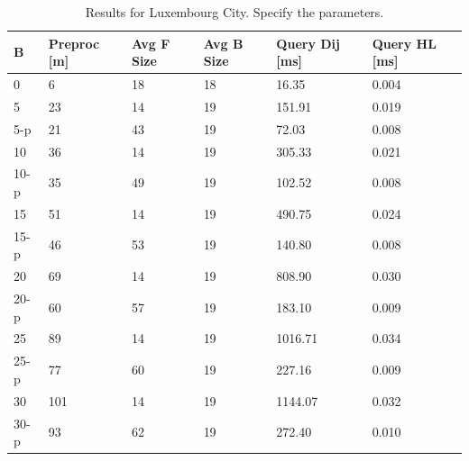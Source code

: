 \begin{table}
\begin{center}
\begin{tabular}{ | l | p{1cm} | p{1cm} | p{1cm} | p{1.2cm} | p{1.2cm} |}
\hline
	B & Preproc  [m] & Avg F Size & Avg B Size & Query Dij [ms] & Query HL [ms] \\ \hline \hline
	0 & 6 & 18 & 18 & 16.35 & 0.004 \\ \hline
	5 & 23 & 14& 19 & 151.91 & 0.019 \\ 
	5-p & 21 & 43 &19 & 72.03 & 0.008 \\ \hline
	10 & 36 & 14 & 19 & 305.33 & 0.021 \\ 
10-p & 35 & 49 & 19 & 102.52 & 0.008 \\ \hline
	15 & 51 & 14& 19 & 490.75 & 0.024 \\ 
	15-p & 46 & 53 & 19 & 140.80 & 0.008 \\ \hline
	20 & 69 & 14 & 19 & 808.90 & 0.030 \\ 
	20-p & 60 & 57 & 19 & 183.10 & 0.009 \\ \hline
	25 & 89 & 14 & 19 & 1016.71 & 0.034 \\ 
	25-p & 77 & 60 & 19 & 227.16 & 0.009 \\ \hline
	30 & 101 & 14& 19 & 1144.07 & 0.032 \\ 
	30-p & 93 & 62 & 19 & 272.40 & 0.010 \\ \hline
\end{tabular}
\caption{Results for Luxembourg City. Specify the parameters.}\label{tab:lu4k_results}
\end{center}
\end{table}


